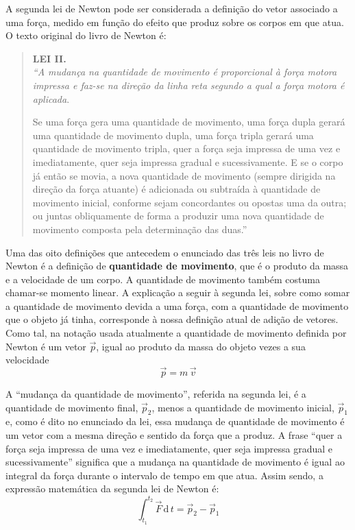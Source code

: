 \documentclass[a4paper,12pt]{article}
\begin{document}
A segunda lei de Newton pode ser considerada a definição do vetor
associado a uma força, medido em função do efeito que produz sobre os
corpos em que atua. O texto original do livro de Newton é:

\begin{quotation}
\noindent\textbf{LEI II.}\\
\emph{``A mudança na quantidade de movimento é proporcional à força
motora impressa e faz-se na direção da linha reta segundo a qual a força
motora é aplicada}.

Se uma força gera uma quantidade de movimento, uma força dupla gerará
uma quantidade de movimento dupla, uma força tripla gerará uma quantidade
de movimento tripla, quer a força seja impressa de uma vez e
imediatamente, quer seja impressa gradual e sucessivamente. E se o corpo
já então se movia, a nova quantidade de movimento (sempre dirigida na
direção da força atuante) é adicionada ou subtraída à quantidade de
movimento inicial, conforme sejam concordantes ou opostas uma da outra; ou
juntas obliquamente de forma a produzir uma nova quantidade de movimento
composta pela determinação das duas.''
\end{quotation}

Uma das oito definições que antecedem o enunciado das três leis no
livro de Newton é a definição de \textbf{quantidade de movimento}, que
é o produto da massa e a velocidade de um corpo. A quantidade de
movimento também costuma chamar-se momento linear. A explicação a
seguir à segunda lei, sobre como somar a quantidade de movimento
devida a uma força, com a quantidade de movimento que o objeto já
tinha, corresponde à nossa definição atual de adição de vetores. Como
tal, na notação usada atualmente a quantidade de movimento definida
por Newton é um vetor $\vec{p}$, igual ao produto da massa do objeto
vezes a sua velocidade
\begin{equation}
\vec{p} = m\,\vec{v}
\end{equation}

A ``mudança da quantidade de movimento'', referida na segunda lei, é a
quantidade de movimento final, $\vec{p}_2$, menos a quantidade de movimento
inicial, $\vec{p}_1$ e, como é dito no enunciado da lei, essa mudança de
quantidade de movimento é um vetor com a mesma direção e sentido da
força que a produz. A frase ``quer a força seja impressa de uma vez e
imediatamente, quer seja impressa gradual e sucessivamente'' significa que
a mudança na quantidade de movimento é igual ao integral da força
durante o intervalo de tempo em que atua. Assim sendo, a expressão
matemática da segunda lei de Newton é:
\begin{equation}
\label{lei1}
 \int_{t_1}^{t_2}\vec{F}\,\mathrm{d}\,t = \vec{p}_2 - \vec{p}_1
\end{equation}
\end{document}
